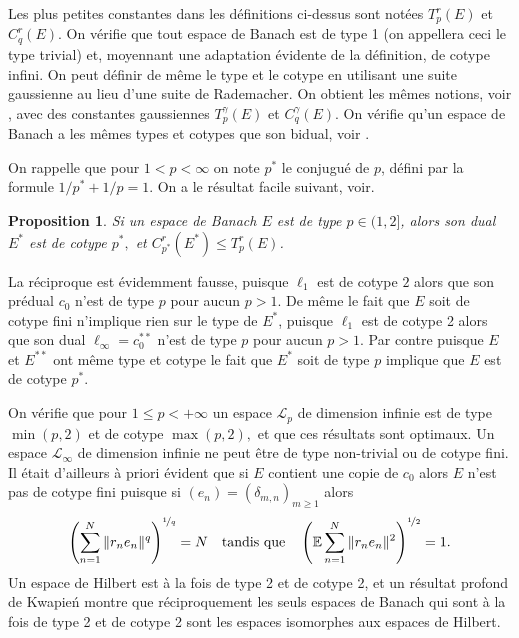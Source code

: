 \documentclass{smfart}
\theoremstyle{plain}
\newtheorem{proposition}[theorem]{Proposition}
\theoremstyle{definition}
\newcommand{\EE}{\mathbb E}
\newcommand{\demi}{{\nicefrac{1}{2}}}
\newcommand {\ELL} {{\mathcal L}}
\begin{document}
\noindent Les plus petites constantes dans les définitions ci-dessus
sont notées $T^r_p(E)$ et $C^r_q(E)$. On vérifie que tout espace de
Banach est de type 1 (on appellera ceci le type trivial) et, moyennant
une adaptation évidente de la définition, de cotype infini. On peut
définir de même le type et le cotype en utilisant une suite gaussienne
au lieu d'une suite de Rademacher. On obtient les mêmes notions, voir
\cite[Proposition 12.11 et Lemma 12.1]{DJT}, avec des constantes
gaussiennes $T^{\gamma}_p(E)$ et $C^{\gamma}_q(E)$. On vérifie qu'un
espace de Banach a les mêmes types et cotypes que son bidual, voir
\cite[Proposition 11.9]{DJT}.

\noindent On rappelle que pour $1<p<\infty$ on note $p^*$ le conjugué de $p$,
défini par la formule $1/p^*+1/p=1$. On a le résultat facile
suivant, voir\cite[Proposition 11.10]{DJT}.

\begin{proposition} 
  Si un espace de Banach $E$ est de type $p\in (1,2]$, alors son dual
  $E^*$ est de cotype $p^*, $ et $C_{p^*}^r(E^*)\le T_p^r(E)$.
\end{proposition}


\noindent La réciproque est évidemment fausse, puisque $\ell_1$ est de
cotype $2$ alors que son prédual $c_0$ n'est de type $p$ pour aucun
$p>1$. De même le fait que $E$ soit de cotype fini n'implique rien
sur le type de $E^*$, puisque $\ell_1$ est de cotype 2 alors que son
dual $\ell_{\infty}=c_0^{**}$ n'est de type $p$ pour aucun $p>1$. Par
contre puisque $E$ et $E^{**}$ ont même type et cotype le fait que
$E^*$ soit de type $p$ implique que $E$ est de cotype $p^*$.


\noindent On vérifie que pour $1\le p <+\infty$ un espace $\ELL_p$ de
dimension infinie est de type $\min(p,2)$ et de cotype $\max(p,2), $ et
que ces résultats sont optimaux. Un espace $\ELL_{\infty}$ de
dimension infinie ne peut être de type non-trivial ou de cotype
fini. Il était d'ailleurs à priori évident que si $E$ contient une
copie de $c_0$ alors $E$ n'est pas de cotype fini puisque si
$(e_n)=(\delta_{m,n})_{m\ge 1}$ alors
\[
\left (\sum   \limits_{n=1}^N\Vert r_ne_n\Vert^q \right )^{\nicefrac{1}{q}}=N
\quad\text{tandis que}\quad
\left (\EE \sum \limits_{n=1}^N\Vert r_ne_n\Vert ^2 \right )^{\demi}=1.
\]
\noindent Un espace de Hilbert est à la fois de type 2 et de cotype 2, et un
résultat profond de Kwapień \cite{K2} montre que réciproquement
les seuls espaces de Banach qui sont à la fois de type 2 et de
cotype 2 sont les espaces isomorphes aux espaces de Hilbert.
\end{document}
